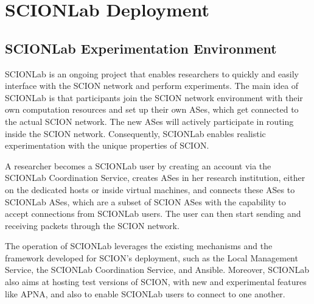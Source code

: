 
\chapter{SCIONLab Deployment} %
\label{scionlab} %

\section{SCIONLab Experimentation Environment}
SCIONLab  is an ongoing project that enables researchers to quickly and easily interface with the SCION network and perform experiments. The main idea of SCIONLab is that participants join the SCION network environment with their own computation resources and set up their own ASes, which get connected to the actual SCION network. The new ASes will actively participate in routing inside the SCION network. Consequently, SCIONLab enables realistic experimentation with the unique properties of SCION.

A researcher becomes a SCIONLab user by creating an account via the SCIONLab Coordination Service, creates ASes in her research institution, either on the dedicated hosts or inside virtual machines, and connects these ASes to SCIONLab ASes, which are a subset of SCION ASes with the capability to accept connections from SCIONLab users. The user can then start sending and receiving packets through the SCION network.

The operation of SCIONLab leverages the existing mechanisms and the framework developed for SCION's deployment, such as the Local Management Service, the SCIONLab Coordination Service, and Ansible. Moreover, SCIONLab also aims at hosting test versions of SCION, with new and experimental features like APNA, and also to enable SCIONLab users to connect to one another.
